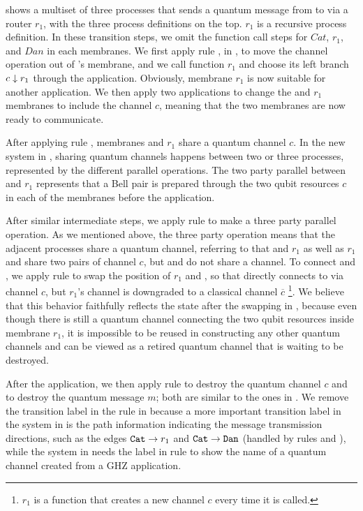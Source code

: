  shows a multiset of three processes that sends a quantum message from  to  via a router $r_1$,
with the three process definitions on the top. $r_1$ is a recursive process definition. In these transition steps, we omit the function call steps for $Cat$, $r_1$, and $Dan$ in each membranes.
We first apply rule , in , to move the channel operation out of 's membrane, and we call function $r_1$ and choose its left branch $c\downarrow r_1$ through the  application.
Obviously, membrane $r_1$ is now suitable for another  application.
We then apply two  applications to change the  and $r_1$ membranes to include the channel $c$,
meaning that the two membranes are now ready to communicate.

After applying rule , membranes  and $r_1$ share a quantum channel $c$.
In the new system in , sharing quantum channels happens between two or three processes, represented by the different parallel operations. The two party parallel between  and $r_1$ represents that a Bell pair is prepared through the two qubit resources $c$ in each of the membranes before the application.

After similar intermediate steps, we apply rule  to make a three party parallel operation.
As we mentioned above, the three party operation means that the adjacent processes share a quantum channel, referring to that  and $r_1$ as well as $r_1$ and  share two pairs of channel $c$, but  and  do not share a channel.
To connect  and , we apply rule  to swap the position of $r_1$ and , so that  directly connects to  via channel $c$, but $r_1$'s channel is downgraded to a classical channel $\overline{c}$ \footnote{$r_1$ is a function that creates a new channel $c$ every time it is called.}.
We believe that this behavior faithfully reflects the state after the swapping in ,
because even though there is still a quantum channel connecting the two qubit resources inside membrane $r_1$,
it is impossible to be reused in constructing any other quantum channels
and can be viewed as a retired quantum channel that is waiting to be destroyed. 

After the  application, we then apply rule  to destroy the quantum channel $c$ and  to destroy the quantum message $m$; both are similar to the ones in .
We remove the transition label in the  rule in 
because a more important transition label in the system in  is the path information indicating the message transmission directions, such as the edges $\texttt{Cat}\to r_1$ and ${\texttt{Cat}\to \texttt{Dan}}$ (handled by rules  and ),
while the system in  needs the label in rule  to show the name of a quantum channel created from a GHZ application.


